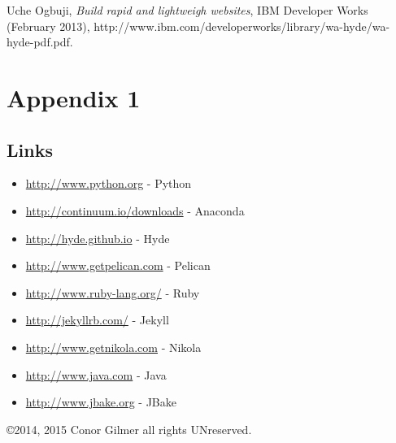 \documentclass[12pt]{article}			%
\begin{document}
\newpage
\begin{thebibliography}{9}

 Uche Ogbuji, \emph{Build rapid and lightweigh websites}, IBM Developer Works (February 2013), http://www.ibm.com/developerworks/library/wa-hyde/wa-hyde-pdf.pdf.  
\end{thebibliography}



\newpage
\appendix
\section{Appendix 1}
\subsection{Links}

\begin{itemize}
\item\url{http://www.python.org} - Python
\item\url{http://continuum.io/downloads} - Anaconda
\item\url{http://hyde.github.io} - Hyde
\item\url{http://www.getpelican.com} - Pelican
\item\url{http://www.ruby-lang.org/} - Ruby
\item\url{http://jekyllrb.com/} - Jekyll
\item\url{http://www.getnikola.com} - Nikola
\item\url{http://www.java.com} - Java
\item\url{http://www.jbake.org} - JBake
\end{itemize}

\copyright 2014, 2015 Conor Gilmer  all rights UNreserved.
\end{document}
